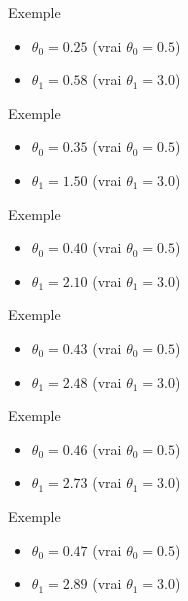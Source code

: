 \begin{frame}{Exemple}
  \begin{itemize}
    \item $\theta_0 = 0.25$ (vrai $\theta_0 = 0.5$)
    \item $\theta_1 = 0.58$ (vrai $\theta_1 = 3.0$)
  \end{itemize}
\end{frame}

\begin{frame}{Exemple}
  \begin{itemize}
    \item $\theta_0 = 0.35$ (vrai $\theta_0 = 0.5$)
    \item $\theta_1 = 1.50$ (vrai $\theta_1 = 3.0$)
  \end{itemize}
\end{frame}

\begin{frame}{Exemple}
  \begin{itemize}
    \item $\theta_0 = 0.40$ (vrai $\theta_0 = 0.5$)
    \item $\theta_1 = 2.10$ (vrai $\theta_1 = 3.0$)
  \end{itemize}
\end{frame}

\begin{frame}{Exemple}
  \begin{itemize}
    \item $\theta_0 = 0.43$ (vrai $\theta_0 = 0.5$)
    \item $\theta_1 = 2.48$ (vrai $\theta_1 = 3.0$)
  \end{itemize}
\end{frame}

\begin{frame}{Exemple}
  \begin{itemize}
    \item $\theta_0 = 0.46$ (vrai $\theta_0 = 0.5$)
    \item $\theta_1 = 2.73$ (vrai $\theta_1 = 3.0$)
  \end{itemize}
\end{frame}

\begin{frame}{Exemple}
  \begin{itemize}
    \item $\theta_0 = 0.47$ (vrai $\theta_0 = 0.5$)
    \item $\theta_1 = 2.89$ (vrai $\theta_1 = 3.0$)
  \end{itemize}
\end{frame}

